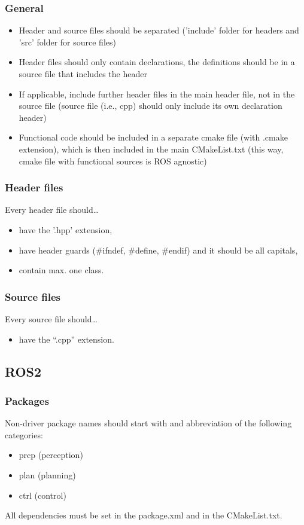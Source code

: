 \documentclass[sn-mathphys-num]{sn-jnl}%
\begin{document}
\subsubsection{General}
\begin{itemize}
    \item Header and source files should be separated ('include' folder for headers and 'src' folder for source files)
    \item Header files should only contain declarations, the definitions should be in a source file that includes the header
    \item If applicable, include further header files in the main header file, not in the source file (source file (i.e., cpp) should only include its own declaration header)
    \item Functional code should be included in a separate cmake file (with .cmake extension), which is then included in the main CMakeList.txt (this way, cmake file with functional sources is ROS agnostic)
\end{itemize}

\subsubsection{Header files}
Every header file should…
\begin{itemize}
    \item have the '.hpp' extension,
    \item have header guards (\#ifndef, \#define, \#endif) and it should be all capitals,
    \item contain max. one class.
\end{itemize}

\subsubsection{Source files}
Every source file should…
\begin{itemize}
    \item have the “.cpp” extension.
\end{itemize}

\subsection{ROS2}
\subsubsection{Packages}
Non-driver package names should start with and abbreviation of the following categories:
\begin{itemize}
    \item prcp (perception)
    \item plan (planning)
    \item ctrl (control)
\end{itemize}
All dependencies must be set in the package.xml and in the CMakeList.txt.
\newpage
\end{document}
